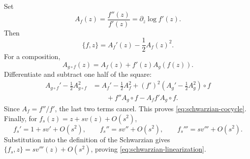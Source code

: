 Set
\[
  A_f(z)=\frac{f''(z)}{f'(z)}=\partial_z\log f'(z).
\]
Then
\[
  \{f,z\}=A_f'(z)-\frac12 A_f(z)^2.
\]
For a composition,
\[
  A_{g\circ f}(z)
  =
  A_f(z)+f'(z)A_g(f(z)).
\]
Differentiate and subtract one half of the square:
\[
\begin{aligned}
  A_{g\circ f}'-\frac12A_{g\circ f}^2
  &=
  A_f'-\frac12A_f^2
  +(f')^2\left(A_g'-\frac12A_g^2\right)\!\circ f
\\
  &\qquad
  +f''A_g\circ f-A_f f' A_g\circ f .
\end{aligned}
\]
Since \(A_f=f''/f'\), the last two terms cancel.  This proves
\eqref{eq:schwarzian-cocycle}.  Finally, for
\(f_s(z)=z+s v(z)+O(s^2)\),
\[
  f_s'=1+s v'+O(s^2),\qquad
  f_s''=s v''+O(s^2),\qquad
  f_s'''=s v'''+O(s^2).
\]
Substitution into the definition of the Schwarzian gives
\(\{f_s,z\}=s v'''(z)+O(s^2)\), proving
\eqref{eq:schwarzian-linearization}.

